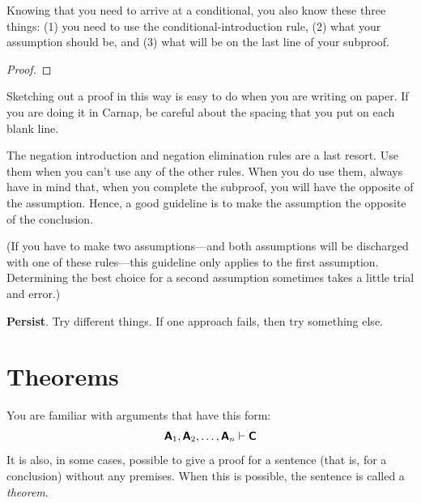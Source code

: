 {{{{{{{{{\begin{earg}
Knowing that you need to arrive at a conditional, you also know these three things: (1) you need to use the conditional-introduction rule, (2) what your assumption should be, and (3) what will be on the last line of your subproof.

\begin{proof}
	 \pr{}
	\open
		\as{}
	\close
	\ci{}
\end{proof}

Sketching out a proof in this way is easy to do when you are writing on paper. If you are doing it in Carnap, be careful about the spacing that you put on each blank line.

\medskip

\item[\ex{18-7}] The negation introduction and negation elimination rules are a last resort. Use them when you can't use any of the other rules. When you do use them, always have in mind that, when you complete the subproof, you will have the opposite of the assumption. Hence, a good guideline is to make the assumption the opposite of the conclusion. 

(If you have to make two assumptions---and both assumptions will be discharged with one of these rules---this guideline only applies to the first assumption. Determining the best choice for a second assumption sometimes takes a little trial and error.)  
\medskip

\item[\ex{18-8}] \textbf{Persist}. Try different things. If one approach fails, then try something else.
\end{earg}





\chapter{Theorems}\label{s:theorems}

You are familiar with arguments that have this form:
$$\bm{\mathsf{A}}_1, \bm{\mathsf{A}}_2, \ldots, \bm{\mathsf{A}}_n \vdash \bm{\mathsf{C}}$$
It is also, in some cases, possible to give a proof for a sentence (that is, for a conclusion) without any premises. When this is possible, the sentence is called a \textit{theorem}.

}}}}}}}}}
